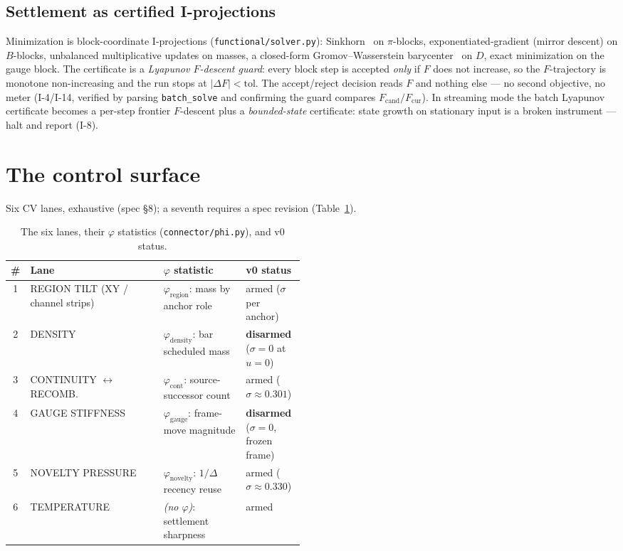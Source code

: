\documentclass[11pt]{article}
\newcommand{\code}[1]{\texttt{\small #1}}
\begin{document}
\subsection{Settlement as certified I-projections}

Minimization is block-coordinate I-projections (\code{functional/solver.py}):
Sinkhorn~\cite{cuturi2013sinkhorn} on $\pi$-blocks, exponentiated-gradient (mirror
descent) on $B$-blocks, unbalanced multiplicative updates on masses, a closed-form
Gromov--Wasserstein barycenter~\cite{peyre2016gw} on $D$, exact minimization on the
gauge block. The certificate is a \emph{Lyapunov
$F$-descent guard}: every block step is accepted \emph{only} if $F$ does not
increase, so the $F$-trajectory is monotone non-increasing and the run stops at
$|\Delta F| < \text{tol}$. The accept/reject decision reads $F$ and nothing else
--- no second objective, no meter (I-4/I-14, verified by parsing \code{batch\_solve}
and confirming the guard compares $F_{\mathrm{cand}}/F_{\mathrm{cur}}$). In
streaming mode the batch Lyapunov certificate becomes a per-step frontier
$F$-descent plus a \emph{bounded-state} certificate: state growth on stationary
input is a broken instrument --- halt and report (I-8).

\section{The control surface}
\label{sec:control}

Six CV lanes, exhaustive (spec \S8); a seventh requires a spec revision
(Table~\ref{tab:lanes}).

\begin{table}[htbp]
\centering
\caption{The six lanes, their $\varphi$ statistics (\code{connector/phi.py}), and
v0 status.}
\label{tab:lanes}
\small
\begin{tabular}{@{}c l >{\raggedright\arraybackslash}p{0.28\linewidth}
  >{\raggedright\arraybackslash}p{0.20\linewidth}@{}}
\toprule
\# & Lane & $\varphi$ statistic & v0 status \\
\midrule
1 & REGION TILT (XY / channel strips) & $\varphi_{\text{region}}$: mass by anchor role & armed ($\sigma$ per anchor) \\
2 & DENSITY & $\varphi_{\text{density}}$: bar scheduled mass & \textbf{disarmed} ($\sigma{=}0$ at $u{=}0$) \\
3 & CONTINUITY $\leftrightarrow$ RECOMB. & $\varphi_{\text{cont}}$: source-successor count & armed ($\sigma\approx 0.301$) \\
4 & GAUGE STIFFNESS & $\varphi_{\text{gauge}}$: frame-move magnitude & \textbf{disarmed} ($\sigma{=}0$, frozen frame) \\
5 & NOVELTY PRESSURE & $\varphi_{\text{novelty}}$: $1/\Delta$ recency reuse & armed ($\sigma\approx 0.330$) \\
6 & TEMPERATURE & \emph{(no $\varphi$)}: settlement sharpness & armed \\
\bottomrule
\end{tabular}
\end{table}
\end{document}
